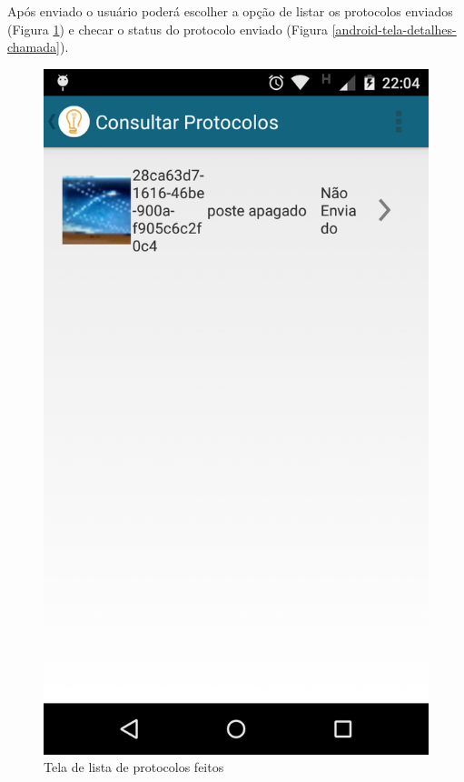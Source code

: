 \documentclass[
	article,			%
	11pt,				%
	oneside,			%
	a4paper,			%
	english,			%
	brazil,				%
	sumario=tradicional
	]{abntex2}
\begin{document}
Após enviado o usuário poderá escolher a opção de listar os protocolos enviados (Figura \ref{android-tela-lista-chamadas}) e checar o status do protocolo enviado (Figura \ref{android-tela-detalhes-chamada}).

\begin{figure}[!htbp]
 \centering
  \begin{minipage}{0.4\textwidth}
    \centering
    \caption{\label{android-tela-lista-chamadas}Tela de lista de protocolos feitos}
    \includegraphics[scale=0.1]{android/7.png}

\end{minipage}
\end{figure}
\end{document}
